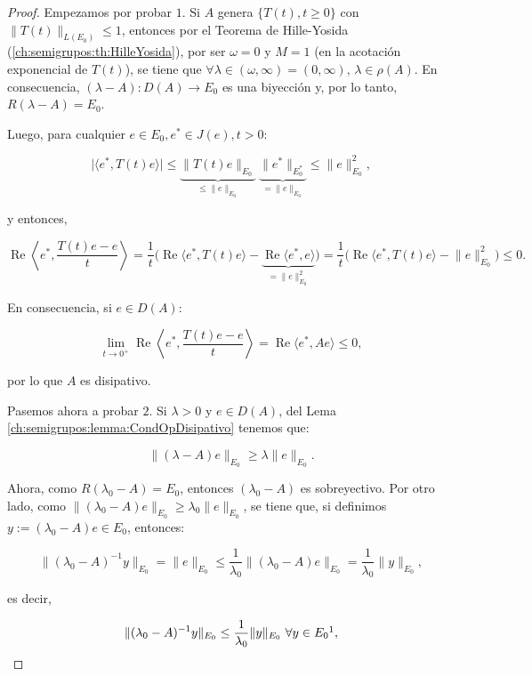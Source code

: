 \begin{proof}
    Empezamos por probar $1$. Si $A$ genera $\{T(t), t \geq 0\}$ con $\lVert T(t) \rVert_{L(E_0)} \leq 1$, entonces por el Teorema de Hille-Yosida (\ref{ch:semigrupos:th:HilleYosida}), por ser $\omega = 0$ y $M = 1$ (en la acotación exponencial de $T(t)$), se tiene que $\forall \lambda \in (\omega, \infty) = (0, \infty), \, \lambda \in \rho(A)$. En consecuencia, $(\lambda - A) : D(A) \rightarrow E_0$ es una biyección y, por lo tanto, $R(\lambda - A) = E_0$.

    Luego, para cualquier $e \in E_0, e^* \in J(e), t > 0$:

    \[\big |\langle e^*, T(t)e \rangle \big | \leq \underbrace{\lVert T(t)e \rVert_{E_0}}_{\leq \lVert e \rVert_{E_0}} \ \underbrace{\lVert e^* \rVert_{E_0^*}}_{= \lVert e \rVert_{E_0}} \leq \lVert e \rVert^2_{E_0},\]

    y entonces,

    \[\operatorname{Re}\left \langle e^*, \frac{T(t)e - e}{t} \right \rangle = \frac{1}{t}\big( \operatorname{Re}\langle e^*, T(t)e \rangle - \underbrace{\operatorname{Re}\langle e^*, e\rangle}_{= \lVert e \rVert^2_{E_0}} \big) = \frac{1}{t}\big( \operatorname{Re}\langle e^*, T(t)e \rangle - \lVert e \rVert^2_{E_0} \big) \leq 0.\]

    En consecuencia, si $e \in D(A)$:

    \[\lim_{t \rightarrow 0^+} \operatorname{Re} \left \langle e^*, \frac{T(t)e - e}{t} \right \rangle = \operatorname{Re} \langle e^*, Ae \rangle \leq 0,\]

    por lo que $A$ es disipativo.

    Pasemos ahora a probar $2$. Si $\lambda > 0$ y $e \in D(A)$, del Lema \ref{ch:semigrupos:lemma:CondOpDisipativo} tenemos que:

    \[\lVert (\lambda - A)e \rVert_{E_0} \geq \lambda \lVert e \rVert_{E_0}.\]

    Ahora, como $R(\lambda_0 - A) = E_0$, entonces $(\lambda_0 - A)$ es sobreyectivo. Por otro lado, como $\lVert (\lambda_0 - A)e \rVert_{E_0} \geq \lambda_0 \lVert e \rVert_{E_0}$, se tiene que, si definimos $y := (\lambda_0 -A)e \in E_0$, entonces:

    \[\lVert (\lambda_0 - A)^{-1}y \rVert_{E_0} = \lVert e \rVert_{E_0} \leq \frac{1}{\lambda_0}\lVert (\lambda_0 - A)e \rVert_{E_0} = \frac{1}{\lambda_0} \lVert y \rVert_{E_0},\]

    es decir,

    \[\lVert (\lambda_0 - A)^{-1}y\rVert_{E_0} \leq \frac{1}{\lambda_0}\lVert y \rVert_{E_0} \ \forall y \in E_0\footnotemark,\]


\end{proof}
